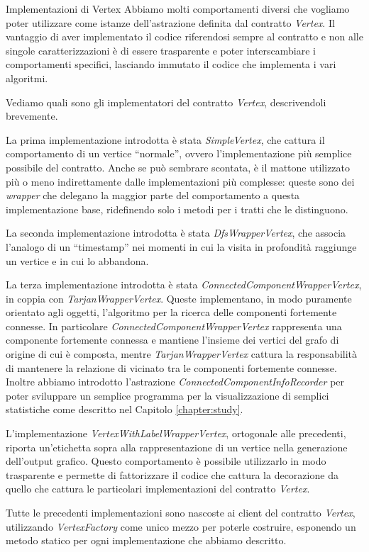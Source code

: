 \begin{paragraph}{Implementazioni di Vertex}
  Abbiamo molti comportamenti diversi che vogliamo poter utilizzare
  come istanze dell'astrazione definita dal contratto
  \emph{Vertex}. Il vantaggio di aver implementato il codice
  riferendosi sempre al contratto e non alle singole caratterizzazioni
  \`e di essere trasparente e poter interscambiare i comportamenti
  specifici, lasciando immutato il codice che implementa i vari
  algoritmi.

  Vediamo quali sono gli implementatori del contratto \emph{Vertex},
  descrivendoli brevemente.

  La prima implementazione introdotta \`e stata \emph{SimpleVertex},
  che cattura il comportamento di un vertice ``normale'', ovvero
  l'implementazione pi\`u semplice possibile del contratto. Anche se
  pu\`o sembrare scontata, \`e il mattone utilizzato pi\`u o meno
  indirettamente dalle implementazioni pi\`u complesse: queste sono
  dei \emph{wrapper} che delegano la maggior parte del comportamento a
  questa implementazione base, ridefinendo solo i metodi per i tratti
  che le distinguono.

  La seconda implementazione introdotta \`e stata
  \emph{DfsWrapperVertex}, che associa l'analogo di un ``timestamp''
  nei momenti in cui la visita in profondit\`a raggiunge un vertice e
  in cui lo abbandona. 

  La terza implementazione introdotta \`e stata
  \emph{ConnectedComponentWrapperVertex}, in coppia con
  \emph{TarjanWrapperVertex}. Queste implementano, in modo puramente
  orientato agli oggetti, l'algoritmo per la ricerca delle componenti
  fortemente connesse. In particolare
  \emph{ConnectedComponentWrapperVertex} rappresenta una componente
  fortemente connessa e mantiene l'insieme dei vertici del grafo di
  origine di cui \`e composta, mentre \emph{TarjanWrapperVertex}
  cattura la responsabilit\`a di mantenere la relazione di vicinato
  tra le componenti fortemente connesse. Inoltre abbiamo introdotto
  l'astrazione \emph{ConnectedComponentInfoRecorder} per poter
  sviluppare un semplice programma per la visualizzazione di semplici
  statistiche come descritto nel Capitolo \ref{chapter:study}.

  L'implementazione \emph{VertexWithLabelWrapperVertex}, ortogonale
  alle precedenti, riporta un'etichetta sopra alla rappresentazione di
  un vertice nella generazione dell'output grafico. Questo
  comportamento \`e possibile utilizzarlo in modo trasparente e
  permette di fattorizzare il codice che cattura la decorazione da
  quello che cattura le particolari implementazioni del contratto
  \emph{Vertex}.

  Tutte le precedenti implementazioni sono nascoste ai client del
  contratto \emph{Vertex}, utilizzando \emph{VertexFactory} come unico
  mezzo per poterle costruire, esponendo un metodo statico per ogni
  implementazione che abbiamo descritto.
\end{paragraph}

